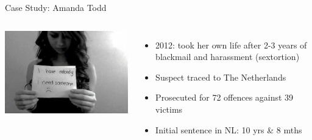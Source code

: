 \documentclass[nobackground,dvipsnames,table,aspectratio=169]{beamer}
\begin{document}
\begin{frame}{Case Study: Amanda Todd}
    \begin{columns}
            \includegraphics[width=\textwidth]{amanda-todd-photo}
            \begin{itemize}
                \item 2012: took her own life after 2-3 years of blackmail and harassment (sextortion)
                \item Suspect traced to The Netherlands
                \item Prosecuted for 72 offences against 39 victims
                \item Initial sentence in NL: 10 yrs \& 8 mths
            \end{itemize}
    \end{columns}
\end{frame}
\end{document}
